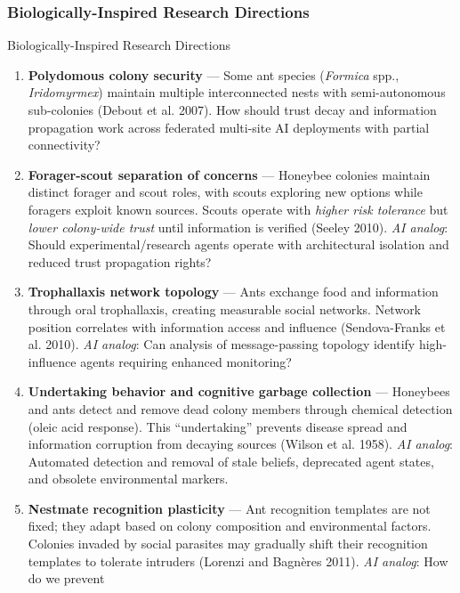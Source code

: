 \documentclass[
  ignorenonframetext,
]{beamer}
\begin{document}
\subsubsection{Biologically-Inspired Research
Directions}\label{biologically-inspired-research-directions}

\begin{frame}[allowframebreaks]{Biologically-Inspired Research
Directions}
\begin{enumerate}
\item
  \textbf{Polydomous colony security} --- Some ant species
  (\emph{Formica} spp., \emph{Iridomyrmex}) maintain multiple
  interconnected nests with semi-autonomous sub-colonies (Debout et al.
  2007). How should trust decay and information propagation work across
  federated multi-site AI deployments with partial connectivity?
\item
  \textbf{Forager-scout separation of concerns} --- Honeybee colonies
  maintain distinct forager and scout roles, with scouts exploring new
  options while foragers exploit known sources. Scouts operate with
  \emph{higher risk tolerance} but \emph{lower colony-wide trust} until
  information is verified (Seeley 2010). \emph{AI analog}: Should
  experimental/research agents operate with architectural isolation and
  reduced trust propagation rights?
\item
  \textbf{Trophallaxis network topology} --- Ants exchange food and
  information through oral trophallaxis, creating measurable social
  networks. Network position correlates with information access and
  influence (Sendova-Franks et al. 2010). \emph{AI analog}: Can analysis
  of message-passing topology identify high-influence agents requiring
  enhanced monitoring?
\item
  \textbf{Undertaking behavior and cognitive garbage collection} ---
  Honeybees and ants detect and remove dead colony members through
  chemical detection (oleic acid response). This ``undertaking''
  prevents disease spread and information corruption from decaying
  sources (Wilson et al. 1958). \emph{AI analog}: Automated detection
  and removal of stale beliefs, deprecated agent states, and obsolete
  environmental markers.
\item
  \textbf{Nestmate recognition plasticity} --- Ant recognition templates
  are not fixed; they adapt based on colony composition and
  environmental factors. Colonies invaded by social parasites may
  gradually shift their recognition templates to tolerate intruders
  (Lorenzi and Bagnères 2011). \emph{AI analog}: How do we prevent

\end{enumerate}
\end{frame}
\end{document}
